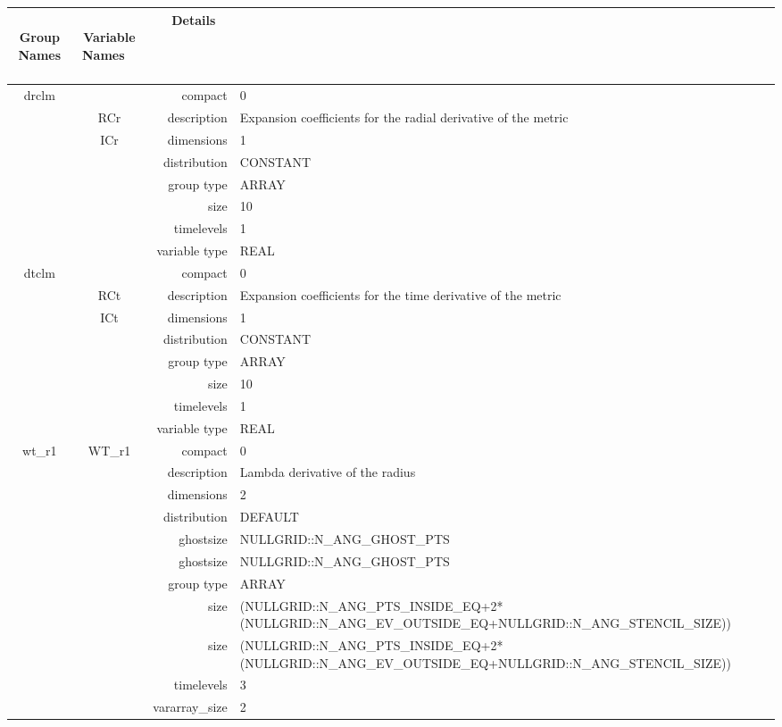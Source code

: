 \vspace{5mm}
\vspace{5mm}

\begin{tabular*}{150mm}{|c|c@{\extracolsep{\fill}}|rl|} \hline 
~ {\bf Group Names} ~ & ~ {\bf Variable Names} ~  &{\bf Details} ~ & ~ \\ 
\hline 
drclm &  & compact & 0 \\ 
 & RCr & description & Expansion coefficients for the radial derivative of the metric \\ 
 & ICr & dimensions & 1 \\ 
 &  & distribution & CONSTANT \\ 
 &  & group type & ARRAY \\ 
 &  & size & 10 \\ 
 &  & timelevels & 1 \\ 
 &  & variable type & REAL \\ 
\hline 
dtclm &  & compact & 0 \\ 
 & RCt & description & Expansion coefficients for the time derivative of the metric \\ 
 & ICt & dimensions & 1 \\ 
 &  & distribution & CONSTANT \\ 
 &  & group type & ARRAY \\ 
 &  & size & 10 \\ 
 &  & timelevels & 1 \\ 
 &  & variable type & REAL \\ 
\hline 
wt\_r1 & WT\_r1 & compact & 0 \\ 
 &  & description & Lambda derivative of the radius \\ 
 &  & dimensions & 2 \\ 
 &  & distribution & DEFAULT \\ 
 &  & ghostsize & NULLGRID::N\_ANG\_GHOST\_PTS \\ 
& ~ & ghostsize & NULLGRID::N\_ANG\_GHOST\_PTS \\ 
 &  & group type & ARRAY \\ 
 &  & size & (NULLGRID::N\_ANG\_PTS\_INSIDE\_EQ+2*(NULLGRID::N\_ANG\_EV\_OUTSIDE\_EQ+NULLGRID::N\_ANG\_STENCIL\_SIZE)) \\ 
& ~ & size & (NULLGRID::N\_ANG\_PTS\_INSIDE\_EQ+2*(NULLGRID::N\_ANG\_EV\_OUTSIDE\_EQ+NULLGRID::N\_ANG\_STENCIL\_SIZE)) \\ 
 &  & timelevels & 3 \\ 
 &  & vararray\_size & 2 \\ 

\end{tabular*}
